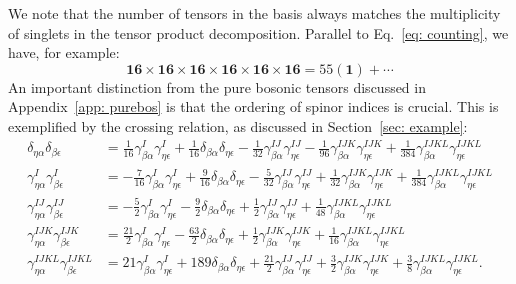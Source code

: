 \documentclass[11pt]{article}
\begin{document}
We note that the number of tensors in the basis always matches the multiplicity of singlets in the tensor product decomposition. Parallel to Eq.~\eqref{eq: counting}, we have, for example:
\begin{equation}
    \mathbf{16} \times \mathbf{16} \times \mathbf{16} \times \mathbf{16} \times \mathbf{16} \times \mathbf{16} = 55 (\mathbf{1}) + \cdots
\end{equation}
An important distinction from the pure bosonic tensors discussed in Appendix~\ref{app: purebos} is that the ordering of spinor indices is crucial. This is exemplified by the crossing relation, as discussed in Section~\ref{sec: example}:
\begin{equation}
    \begin{split}
        \delta_{\eta \alpha}\delta_{\beta \epsilon}&=\frac{1}{16} \gamma _{\beta \alpha }^I \gamma _{\eta \epsilon }^I+\frac{1}{16} \delta _{\beta \alpha } \delta _{\eta \epsilon }-\frac{1}{32} \gamma _{\beta \alpha }^{IJ} \gamma _{\eta \epsilon }^{IJ}-\frac{1}{96} \gamma _{\beta \alpha }^{IJK} \gamma _{\eta \epsilon }^{IJK}+\frac{1}{384} \gamma _{\beta \alpha }^{IJKL} \gamma _{\eta \epsilon }^{IJKL}\\
        \gamma_{\eta \alpha}^I\gamma_{\beta \epsilon}^I&=-\frac{7}{16} \gamma _{\beta \alpha }^I \gamma _{\eta \epsilon }^I+\frac{9}{16} \delta _{\beta \alpha } \delta _{\eta \epsilon }-\frac{5}{32} \gamma _{\beta \alpha }^{IJ} \gamma _{\eta \epsilon }^{IJ}+\frac{1}{32} \gamma _{\beta \alpha }^{IJK} \gamma _{\eta \epsilon }^{IJK}+\frac{1}{384} \gamma _{\beta \alpha }^{IJKL} \gamma _{\eta \epsilon }^{IJKL}\\
        \gamma_{\eta \alpha}^{IJ} \gamma_{\beta \epsilon}^{IJ}&=-\frac{5}{2} \gamma _{\beta \alpha }^I \gamma _{\eta \epsilon }^I-\frac{9}{2} \delta _{\beta \alpha } \delta _{\eta \epsilon }+\frac{1}{2} \gamma _{\beta \alpha }^{IJ} \gamma _{\eta \epsilon }^{IJ}+\frac{1}{48} \gamma _{\beta \alpha }^{IJKL} \gamma _{\eta \epsilon }^{IJKL}\\
        \gamma_{\eta \alpha}^{IJK} \gamma_{\beta \epsilon}^{IJK}&=\frac{21}{2} \gamma _{\beta \alpha }^I \gamma _{\eta \epsilon }^I-\frac{63}{2} \delta _{\beta \alpha } \delta _{\eta \epsilon }+\frac{1}{2} \gamma _{\beta \alpha }^{IJK} \gamma _{\eta \epsilon }^{IJK}+\frac{1}{16} \gamma _{\beta \alpha }^{IJKL} \gamma _{\eta \epsilon }^{IJKL}\\
        \gamma_{\eta \alpha}^{IJKL} \gamma_{\beta \epsilon}^{IJKL}&=21 \gamma _{\beta \alpha }^I \gamma _{\eta \epsilon }^I+189 \delta _{\beta \alpha } \delta _{\eta \epsilon }+\frac{21}{2} \gamma _{\beta \alpha }^{IJ} \gamma _{\eta \epsilon }^{IJ}+\frac{3}{2} \gamma _{\beta \alpha }^{IJK} \gamma _{\eta \epsilon }^{IJK}+\frac{3}{8} \gamma _{\beta \alpha }^{IJKL} \gamma _{\eta \epsilon }^{IJKL}.
    \end{split}
\end{equation}
\end{document}

